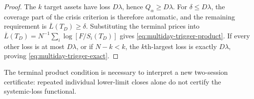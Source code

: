 \documentclass[review,hidelinks,onefignum,onetabnum]{siamonline250211}
\begin{document}
\begin{proof}
The $k$ target assets have loss $D\lambda$, hence $Q_\alpha\ge D\lambda$. For $\delta\le D\lambda$, the coverage part of the crisis criterion is therefore automatic, and the remaining requirement is $\overline L(T_D)\ge\delta$. Substituting the terminal prices into $\overline L(T_D)=N^{-1}\sum_i\log[F/S_i(T_D)]$ gives \eqref{eq:multiday-trigger-product}. If every other loss is at most $D\lambda$, or if $N-k<k$, the $k$th-largest loss is exactly $D\lambda$, proving \eqref{eq:multiday-trigger-exact}.
\end{proof}

The terminal product condition is necessary to interpret a new two-session certificate: repeated individual lower-limit closes alone do not certify the systemic-loss functional.
\end{document}
